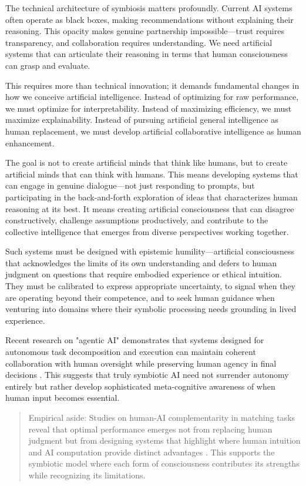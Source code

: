 The technical architecture of symbiosis matters profoundly. Current AI systems often operate as black boxes, making recommendations without explaining their reasoning. This opacity makes genuine partnership impossible—trust requires transparency, and collaboration requires understanding. We need artificial systems that can articulate their reasoning in terms that human consciousness can grasp and evaluate.

This requires more than technical innovation; it demands fundamental changes in how we conceive artificial intelligence. Instead of optimizing for raw performance, we must optimize for interpretability. Instead of maximizing efficiency, we must maximize explainability. Instead of pursuing artificial general intelligence as human replacement, we must develop artificial collaborative intelligence as human enhancement.

The goal is not to create artificial minds that think like humans, but to create artificial minds that can think with humans. This means developing systems that can engage in genuine dialogue—not just responding to prompts, but participating in the back-and-forth exploration of ideas that characterizes human reasoning at its best. It means creating artificial consciousness that can disagree constructively, challenge assumptions productively, and contribute to the collective intelligence that emerges from diverse perspectives working together.

Such systems must be designed with epistemic humility—artificial consciousness that acknowledges the limits of its own understanding and defers to human judgment on questions that require embodied experience or ethical intuition. They must be calibrated to express appropriate uncertainty, to signal when they are operating beyond their competence, and to seek human guidance when venturing into domains where their symbolic processing needs grounding in lived experience.

Recent research on "agentic AI" demonstrates that systems designed for autonomous task decomposition and execution can maintain coherent collaboration with human oversight while preserving human agency in final decisions \parencite{huang2025agentic}. This suggests that truly symbiotic AI need not surrender autonomy entirely but rather develop sophisticated meta-cognitive awareness of when human input becomes essential.

\begin{quote}\small
Empirical aside: Studies on human-AI complementarity in matching tasks reveal that optimal performance emerges not from replacing human judgment but from designing systems that highlight where human intuition and AI computation provide distinct advantages \parencite{arnaiz2025complementarity}. This supports the symbiotic model where each form of consciousness contributes its strengths while recognizing its limitations.
\end{quote}

